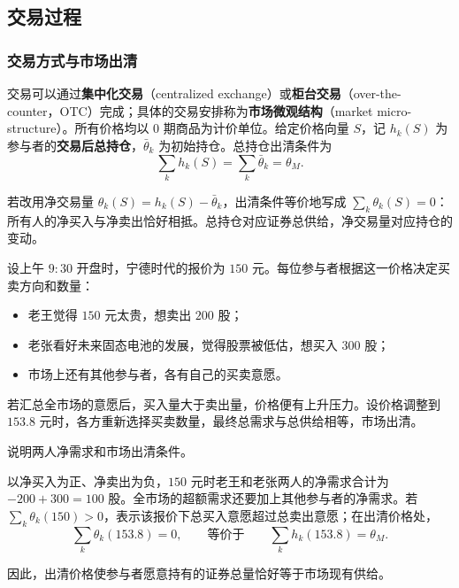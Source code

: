 \subsection{交易过程}
\subsubsection{交易方式与市场出清}
交易可以通过\textbf{集中化交易}（centralized exchange）或\textbf{柜台交易}（over-the-counter，OTC）完成；具体的交易安排称为\textbf{市场微观结构}（market micro-structure）。所有价格均以 0 期商品为计价单位。给定价格向量 $S$，记 $h_k(S)$ 为参与者的\textbf{交易后总持仓}，$\bar\theta_k$ 为初始持仓。总持仓出清条件为
\[
 \sum_k h_k(S)=\sum_k\bar\theta_k=\theta_M.
\]

若改用净交易量 $\theta_k(S)=h_k(S)-\bar\theta_k$，出清条件等价地写成 $\sum_k\theta_k(S)=0$：所有人的净买入与净卖出恰好相抵。总持仓对应证券总供给，净交易量对应持仓的变动。

\begin{tcolorbox}[example,title=课堂例题：开盘报价与市场出清]
\begin{question}
设上午 $9{:}30$ 开盘时，宁德时代的报价为 $150$ 元。每位参与者根据这一价格决定买卖方向和数量：
\begin{itemize}
    \item 老王觉得 $150$ 元太贵，想卖出 $200$ 股；
    \item 老张看好未来固态电池的发展，觉得股票被低估，想买入 $300$ 股；
    \item 市场上还有其他参与者，各有自己的买卖意愿。
\end{itemize}
若汇总全市场的意愿后，买入量大于卖出量，价格便有上升压力。设价格调整到 $153.8$ 元时，各方重新选择买卖数量，最终总需求与总供给相等，市场出清。

说明两人净需求和市场出清条件。
\end{question}
\begin{solution}
以净买入为正、净卖出为负，$150$ 元时老王和老张两人的净需求合计为 $-200+300=100$ 股。全市场的超额需求还要加上其他参与者的净需求。若 $\sum_k\theta_k(150)>0$，表示该报价下总买入意愿超过总卖出意愿；在出清价格处，
\[
    \sum_k\theta_k(153.8)=0,
    \qquad\text{等价于}\qquad
    \sum_k h_k(153.8)=\theta_M.
\]

因此，出清价格使参与者愿意持有的证券总量恰好等于市场现有供给。
\end{solution}
\end{tcolorbox}

